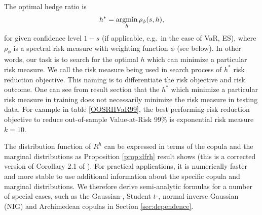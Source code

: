 \documentclass[11pt,a4paper,english]{article}
\begin{document}
The optimal hedge ratio is
\begin{align}
    h^\ast = \argmin_h \rho_\phi(s,h),
    \end{align}
for given
confidence level $1-s$ (if applicable, e.g.\ in the case of VaR, ES),
where $\rho_\phi$ is a spectral risk measure with weighting function
$\phi$ (see below).
In other words, our task is to search for the optimal $h$ which can minimize a particular risk measure.
We call the risk measure being used in search process of $h^\ast$ risk reduction objective.
This naming is to differentiate the risk objective and risk outcome.
One can see from result section that the $h^\ast$ which minimize a particular risk measure in training does not
necessarily minimize the risk measure in testing data.
For example in table \ref{OOSRHVaR99}, the best performing risk reduction objective to reduce out-of-sample Value-at-Risk 99\% is
exponential risk measure $k=10$. \medskip

The distribution function of $R^h$ can be expressed in terms of the
copula and the marginal distributions as Proposition \ref{prop:dfrh}
result shows (this is a corrected version of Corollary 2.1 of
\citep{barbi2014copula}). For practical applications, it is numerically
faster and more stable to use additional information about the
specific copula and marginal distributions. We therefore derive
semi-analytic formulas for a number of special cases, such as the
Gaussian-, Student $t$-, normal inverse Gaussian (NIG) and Archimedean
copulas in Section \ref{sec:dependence}.
\end{document}
